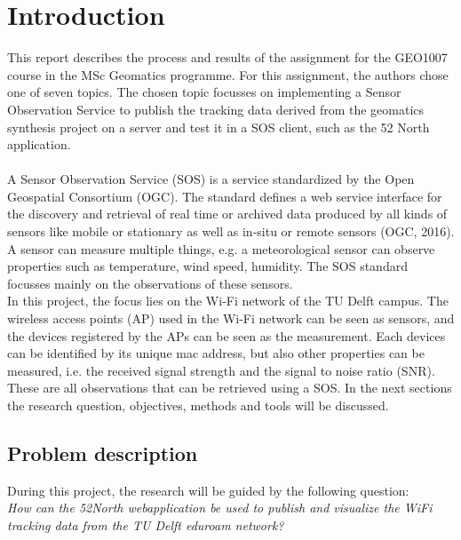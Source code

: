 \chapter{Introduction}
This report describes the process and results of the assignment for the GEO1007 course in the MSc Geomatics programme. For this assignment, the authors chose one of seven topics. The chosen topic focusses on implementing a Sensor Observation Service to publish the tracking data derived from the geomatics synthesis project on a server and test it in a SOS client, such as the 52 North application. \\\\
A Sensor Observation Service (SOS) is a service standardized by the Open Geospatial Consortium (OGC). The standard defines a web service interface for the discovery and retrieval of real time or archived data produced by all kinds of sensors like mobile or stationary as well as in-situ or remote sensors (OGC, 2016). A sensor can measure multiple things, e.g. a meteorological sensor can observe properties such as temperature, wind speed, humidity. The SOS standard focusses mainly on the observations of these sensors. \\
In this project, the focus lies on the Wi-Fi network of the TU Delft campus. The wireless access points (AP) used in the Wi-Fi network can be seen as sensors, and the devices registered by the APs can be seen as the measurement. Each devices can be identified by its unique mac address, but also other properties can be measured, i.e. the received signal strength and the signal to noise ratio (SNR). These are all observations that can be retrieved using a SOS. In the next sections the research question, objectives, methods and tools will be discussed.

\section{Problem description}

During this project, the research will be guided by the following question:\\
\textit{How can the 52North webapplication be used to publish and visualize the WiFi tracking data from the TU Delft eduroam network?}\\


